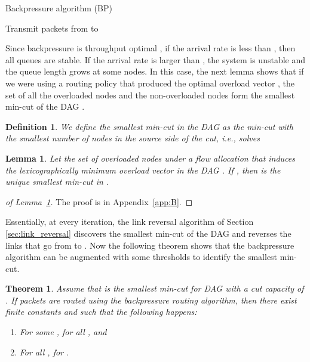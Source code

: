 \documentclass{sig-alternate-2013}
\newtheorem{definition}{Definition}
\newtheorem{lemma}{Lemma}
\newtheorem{theorem}{Theorem}
\begin{document}
\begin{algorithm} [h]
\caption{Backpressure algorithm (BP)}
\label{alg: backpressure}
\begin{algorithmic}[1]
\ForAll{} 
	\If{}
		\State Transmit  packets from   to 
\EndIf
\EndFor
\end{algorithmic}
\end{algorithm}

Since backpressure is throughput optimal \cite{tassiulas}, if the arrival rate is less than  , then all queues are stable.
If the arrival rate is larger than , the system is unstable and the queue length  grows at some nodes. In this case, the next lemma shows that if we were using a routing policy that produced the optimal overload vector , the set of all the overloaded nodes  and the non-overloaded nodes   form the smallest min-cut of the DAG .

\begin{definition}\label{def:smallest min-cut}
We define the smallest min-cut  in the DAG  as the min-cut with the smallest number of nodes in the source side of the cut, i.e.,  solves

\end{definition}

\begin{lemma}\label{SMALLEST MIN-CUT}
Let   the set of overloaded nodes under a flow allocation  that induces the lexicographically minimum overload vector in the DAG . If , then  is the unique smallest min-cut in .
\end{lemma}
\begin{proof}[of Lemma~\ref{SMALLEST MIN-CUT}]
The proof is in Appendix~\ref{app:B}.
\end{proof}



Essentially, at every iteration, the link reversal algorithm of Section \ref{sec:link_reversal} discovers the smallest min-cut  of the DAG  and reverses the links that go from  to . Now the following theorem shows that the backpressure algorithm can be augmented with some thresholds to identify the smallest min-cut.

\begin{theorem} \label{BP_THRESHOLD_PROOF}
Assume that  is the smallest min-cut for DAG  with a cut capacity of . If packets are routed using the backpressure routing algorithm, then there exist finite constants  and  such that the following happens:
\begin{enumerate}
\item For some ,  for all , and
\item For all ,  for .
\end{enumerate}
\end{theorem}
\end{document}
